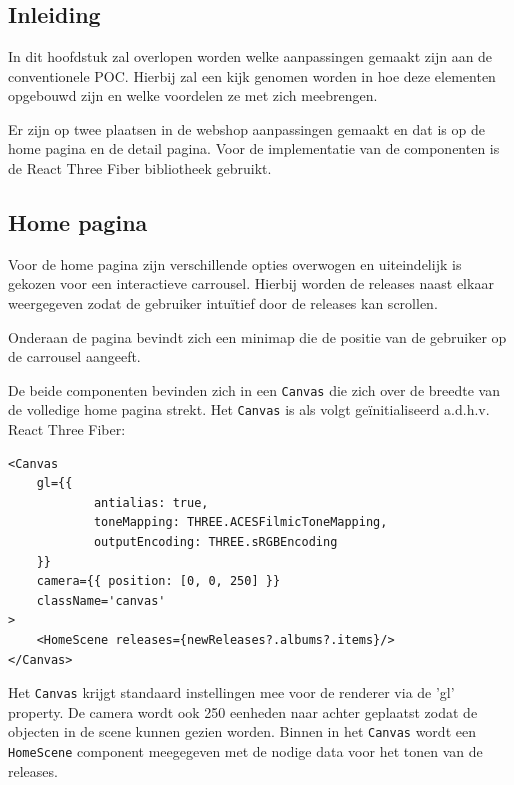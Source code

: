 
\chapter{}%
\label{ch:proofofconceptThreeJS}

\section{Inleiding}

In dit hoofdstuk zal overlopen worden welke aanpassingen gemaakt zijn aan de conventionele POC. Hierbij zal een kijk genomen worden in hoe deze elementen opgebouwd zijn en welke voordelen ze met zich meebrengen.

Er zijn op twee plaatsen in de webshop aanpassingen gemaakt en dat is op de home pagina en de detail pagina. Voor de implementatie van de componenten is de React Three Fiber bibliotheek gebruikt.

\section{Home pagina}

Voor de home pagina zijn verschillende opties overwogen en uiteindelijk is gekozen voor een interactieve carrousel. Hierbij worden de releases naast elkaar weergegeven zodat de gebruiker intuïtief door de releases kan scrollen.

Onderaan de pagina bevindt zich een minimap die de positie van de gebruiker op de carrousel aangeeft.

De beide componenten bevinden zich in een \texttt{Canvas} die zich over de breedte van de volledige home pagina strekt. Het \texttt{Canvas} is als volgt geïnitialiseerd a.d.h.v. React Three Fiber: 

\newpage

\begin{lstlisting}
<Canvas
	gl={{
			antialias: true,
			toneMapping: THREE.ACESFilmicToneMapping,
			outputEncoding: THREE.sRGBEncoding
	}}
	camera={{ position: [0, 0, 250] }}
	className='canvas'
>
	<HomeScene releases={newReleases?.albums?.items}/>
</Canvas>
\end{lstlisting}

Het \texttt{Canvas} krijgt standaard instellingen mee voor de renderer via de 'gl' property. De camera wordt ook 250 eenheden naar achter geplaatst zodat de objecten in de scene kunnen gezien worden. Binnen in het \texttt{Canvas} wordt een \texttt{HomeScene} component meegegeven met de nodige data voor het tonen van de releases.

